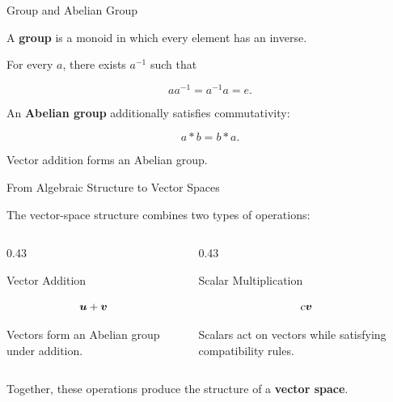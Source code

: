 
\begin{frame}{Group and Abelian Group}

A \textbf{group} is a monoid in which every element has
an inverse.

For every $a$, there exists $a^{-1}$ such that

\[
aa^{-1}=a^{-1}a=e.
\]

\vspace{0.4cm}

An \textbf{Abelian group} additionally satisfies commutativity:

\[
\boxed{
a*b=b*a.
}
\]

\vspace{0.3cm}

Vector addition forms an Abelian group.

\end{frame}



\begin{frame}{From Algebraic Structure to Vector Spaces}

The vector-space structure combines two types of operations:

\vspace{0.4cm}

\begin{columns}[T,totalwidth=\textwidth]

\begin{column}{0.43\textwidth}

\begin{block}{Vector Addition}

\[
\bm{u}+\bm{v}
\]

Vectors form an Abelian group under addition.

\end{block}

\end{column}

\begin{column}{0.43\textwidth}

\begin{block}{Scalar Multiplication}

\[
c\bm{v}
\]

Scalars act on vectors while satisfying compatibility rules.

\end{block}

\end{column}

\end{columns}

\vspace{0.5cm}

Together, these operations produce the structure of a
\textbf{vector space}.

\end{frame}


